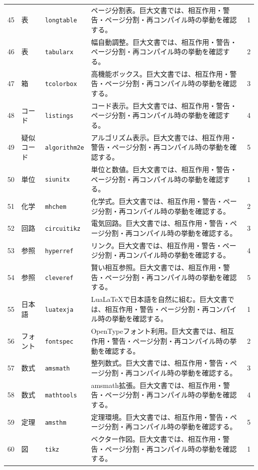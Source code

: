 \documentclass[12pt,a4paper,openany]{ltjsbook}
\theoremstyle{definition}
\theoremstyle{plain}
\theoremstyle{remark}
\begin{document}
\begin{landscape}
\begin{longtable}{llp{55mm}p{80mm}r}
45 & 表 & \texttt{longtable} & ページ分割表。巨大文書では、相互作用・警告・ページ分割・再コンパイル時の挙動を確認する。 & 1\\
46 & 表 & \texttt{tabularx} & 幅自動調整。巨大文書では、相互作用・警告・ページ分割・再コンパイル時の挙動を確認する。 & 2\\
47 & 箱 & \texttt{tcolorbox} & 高機能ボックス。巨大文書では、相互作用・警告・ページ分割・再コンパイル時の挙動を確認する。 & 3\\
48 & コード & \texttt{listings} & コード表示。巨大文書では、相互作用・警告・ページ分割・再コンパイル時の挙動を確認する。 & 4\\
49 & 疑似コード & \texttt{algorithm2e} & アルゴリズム表示。巨大文書では、相互作用・警告・ページ分割・再コンパイル時の挙動を確認する。 & 5\\
50 & 単位 & \texttt{siunitx} & 単位と数値。巨大文書では、相互作用・警告・ページ分割・再コンパイル時の挙動を確認する。 & 1\\
51 & 化学 & \texttt{mhchem} & 化学式。巨大文書では、相互作用・警告・ページ分割・再コンパイル時の挙動を確認する。 & 2\\
52 & 回路 & \texttt{circuitikz} & 電気回路。巨大文書では、相互作用・警告・ページ分割・再コンパイル時の挙動を確認する。 & 3\\
53 & 参照 & \texttt{hyperref} & リンク。巨大文書では、相互作用・警告・ページ分割・再コンパイル時の挙動を確認する。 & 4\\
54 & 参照 & \texttt{cleveref} & 賢い相互参照。巨大文書では、相互作用・警告・ページ分割・再コンパイル時の挙動を確認する。 & 5\\
55 & 日本語 & \texttt{luatexja} & LuaLaTeXで日本語を自然に組む。巨大文書では、相互作用・警告・ページ分割・再コンパイル時の挙動を確認する。 & 1\\
56 & フォント & \texttt{fontspec} & OpenTypeフォント利用。巨大文書では、相互作用・警告・ページ分割・再コンパイル時の挙動を確認する。 & 2\\
57 & 数式 & \texttt{amsmath} & 整列数式。巨大文書では、相互作用・警告・ページ分割・再コンパイル時の挙動を確認する。 & 3\\
58 & 数式 & \texttt{mathtools} & amsmath拡張。巨大文書では、相互作用・警告・ページ分割・再コンパイル時の挙動を確認する。 & 4\\
59 & 定理 & \texttt{amsthm} & 定理環境。巨大文書では、相互作用・警告・ページ分割・再コンパイル時の挙動を確認する。 & 5\\
60 & 図 & \texttt{tikz} & ベクター作図。巨大文書では、相互作用・警告・ページ分割・再コンパイル時の挙動を確認する。 & 1\\

\end{longtable}
\end{landscape}
\end{document}
